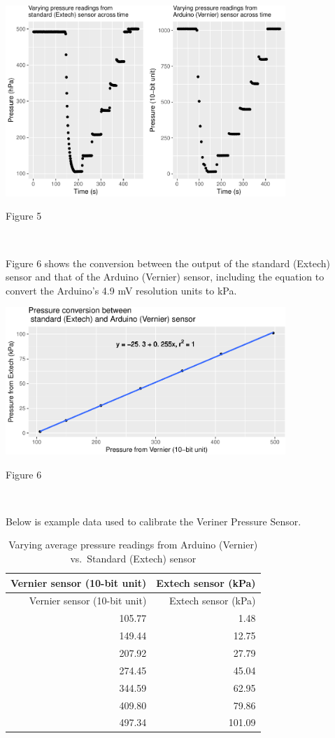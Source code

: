 \documentclass[12pt,]{article}
\begin{document}
\begin{flushleft}\includegraphics[width=400px]{paper_files/figure-latex/vernier_calibration-1} \end{flushleft}

Figure 5

~

Figure 6 shows the conversion between the output of the standard
(Extech) sensor and that of the Arduino (Vernier) sensor, including the
equation to convert the Arduino's 4.9 mV resolution units to kPa.

\begin{center}\includegraphics[width=400px]{paper_files/figure-latex/vernier_cal2-1} \end{center}

Figure 6

~

Below is example data used to calibrate the Veriner Pressure Sensor.

\begin{longtable}[]{@{}rr@{}}
\caption{Varying average pressure readings from Arduino (Vernier)
vs.~Standard (Extech) sensor}\tabularnewline
\toprule
Vernier sensor (10-bit unit) & Extech sensor (kPa)\tabularnewline
\midrule
\endfirsthead
\toprule
Vernier sensor (10-bit unit) & Extech sensor (kPa)\tabularnewline
\midrule
\endhead
105.77 & 1.48\tabularnewline
149.44 & 12.75\tabularnewline
207.92 & 27.79\tabularnewline
274.45 & 45.04\tabularnewline
344.59 & 62.95\tabularnewline
409.80 & 79.86\tabularnewline
497.34 & 101.09\tabularnewline
\bottomrule
\end{longtable}
\end{document}
